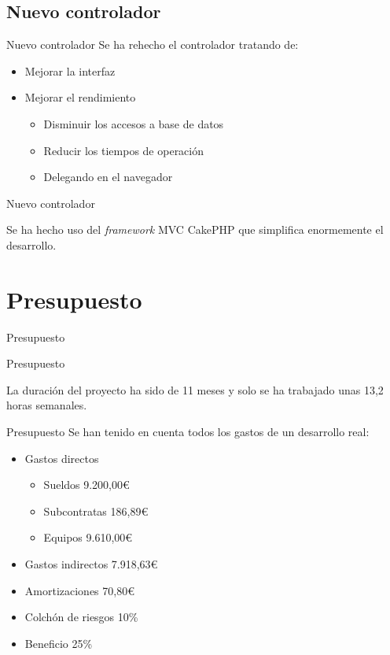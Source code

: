 \documentclass[12pt]{beamer}
\newcommand{\mysection}[1]{\begin{frame}{}\begin{center}\Huge #1\end{center}\end{frame}}
\begin{document}
\subsection{Nuevo controlador}
\begin{frame}{Nuevo controlador}
	Se ha rehecho el controlador tratando de:
	\pause
	\begin{itemize}
		\item Mejorar la interfaz
		\item Mejorar el rendimiento
		\begin{itemize}
			\item Disminuir los accesos a base de datos
			\item Reducir los tiempos de operación
			\item Delegando en el navegador
		\end{itemize}
	\end{itemize}
\end{frame}

\begin{frame}{Nuevo controlador}
	\begin{center}
		Se ha hecho uso del \emph{framework} MVC CakePHP que simplifica enormemente el desarrollo.
	\end{center}
\end{frame}


\section{Presupuesto}
\mysection{Presupuesto}

\begin{frame}{Presupuesto}
	\begin{center}
		La duración del proyecto ha sido de 11 meses y solo se ha trabajado unas 13,2 horas semanales.
	\end{center}
\end{frame}

\begin{frame}{Presupuesto}
	Se han tenido en cuenta todos los gastos de un desarrollo real:
	\pause
	\begin{itemize}
		\item Gastos directos
		\begin{itemize}
			\item Sueldos \color{green}9.200,00\euro
			\item Subcontratas \color{green}186,89\euro
			\item Equipos \color{green}9.610,00\euro
		\end{itemize}
		\item Gastos indirectos \color{green}7.918,63\euro
		\item Amortizaciones \color{green}70,80\euro
		\item Colchón de riesgos \color{green}10\%
		\item Beneficio \color{green}25\%
	\end{itemize}
\end{frame}
\end{document}
